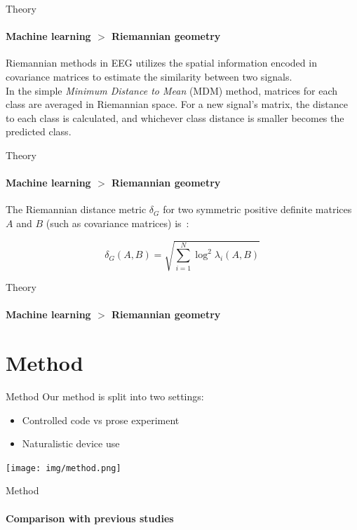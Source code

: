 \documentclass[xcolor={dvipsnames,table},12pt]{beamer}
\newif\ifplacelogo{}  %
\begin{document}
\begin{frame}{Theory}
    \framesubtitle{Machine learning $>$ Riemannian geometry}
    
    Riemannian methods in EEG utilizes the spatial information encoded in covariance matrices to estimate the similarity between two signals.
    \\
    \vspace{1em}
    In the simple \emph{Minimum Distance to Mean} (MDM) method, matrices for each class are averaged in Riemannian space. For a new signal's matrix, the distance to each class is calculated, and whichever class distance is smaller becomes the predicted class.
\end{frame}

\begin{frame}{Theory}
    \framesubtitle{Machine learning $>$ Riemannian geometry}
    
    \small The Riemannian distance metric $\delta_G$ for two symmetric positive definite matrices $A$ and $B$ (such as covariance matrices) is~\cite{grafarend_metric_2003}:

        \[ \delta_G(A, B) = \sqrt{\sum_{i=1}^N \log^2 \lambda_i (A, B) } \]
\end{frame}

\begin{frame}{Theory}
    \framesubtitle{Machine learning $>$ Riemannian geometry}
    {
        \scriptsize
        
    }
\end{frame}

\section{Method}
\begin{frame}{Method}
    Our method is split into two settings:

    \begin{itemize}
            \item Controlled code vs prose experiment
            \item Naturalistic device use
    \end{itemize}

    \texttt{[image: img/method.png]}
\end{frame}

\placelogofalse{}
\begin{frame}{Method}
    \framesubtitle{Comparison with previous studies}
    \vspace*{-10mm}
    \begin{adjustbox}{width=\textwidth,center,float=table}
        
    \end{adjustbox}
\end{frame}
\placelogotrue{}
\end{document}
